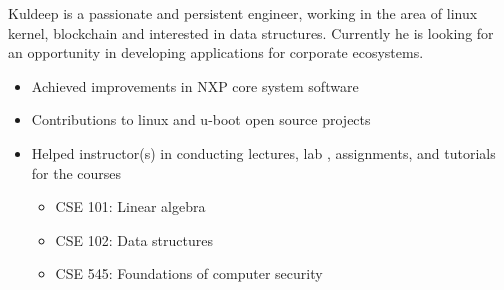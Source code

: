 \documentclass[10pt,a4paper,ragged2e]{altacv}
\begin{document}

\begin{fullwidth}
\makecvheader
\end{fullwidth}


Kuldeep is a passionate and persistent engineer, working in the area of linux kernel, blockchain and interested in data structures. Currently he is looking for an opportunity in developing applications for corporate ecosystems.
\smallskip

\begin{itemize}
\item Achieved improvements in NXP core system software
\smallskip
\item Contributions to linux and u-boot open source projects
\smallskip
\end{itemize}
\smallskip

\begin{itemize}
\item Helped instructor(s) in conducting lectures, lab , assignments, and tutorials for the courses
    \begin{itemize}
        \item CSE 101: Linear algebra
        \item CSE 102: Data structures
        \item CSE 545: Foundations of computer security
    \end{itemize}
\smallskip
\end{itemize}
\end{document}
